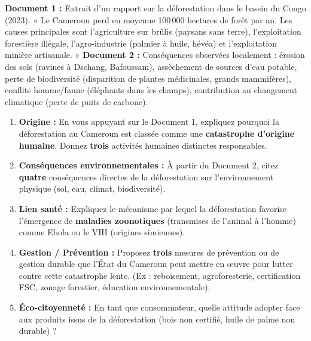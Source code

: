 \documentclass[11pt]{article}
\begin{document}
\begin{exercice}
\textbf{Document 1 :} Extrait d'un rapport sur la déforestation dans le bassin du Congo (2023). « Le Cameroun perd en moyenne 100\,000 hectares de forêt par an. Les causes principales sont l'agriculture sur brûlis (paysans sans terre), l'exploitation forestière illégale, l'agro-industrie (palmier à huile, hévéa) et l'exploitation minière artisanale. »
\textbf{Document 2 :} Conséquences observées localement : érosion des sols (ravines à Dschang, Bafoussam), assèchement de sources d'eau potable, perte de biodiversité (disparition de plantes médicinales, grands mammifères), conflits homme/faune (éléphants dans les champs), contribution au changement climatique (perte de puits de carbone).

\begin{enumerate}
\item \textbf{Origine :} En vous appuyant sur le Document 1, expliquez pourquoi la déforestation au Cameroun est classée comme une \textbf{catastrophe d'origine humaine}. Donnez \textbf{trois} activités humaines distinctes responsables.
\item \textbf{Conséquences environnementales :} À partir du Document 2, citez \textbf{quatre} conséquences directes de la déforestation sur l'environnement physique (sol, eau, climat, biodiversité).
\item \textbf{Lien santé :} Expliquez le mécanisme par lequel la déforestation favorise l'émergence de \textbf{maladies zoonotiques} (transmises de l'animal à l'homme) comme Ebola ou le VIH (origines simiennes).
\item \textbf{Gestion / Prévention :} Proposez \textbf{trois} mesures de prévention ou de gestion durable que l'État du Cameroun peut mettre en œuvre pour lutter contre cette catastrophe lente. (Ex : reboisement, agroforesterie, certification FSC, zonage forestier, éducation environnementale).
\item \textbf{Éco-citoyenneté :} En tant que consommateur, quelle attitude adopter face aux produits issus de la déforestation (bois non certifié, huile de palme non durable) ?
\end{enumerate}
\end{exercice}
\end{document}
